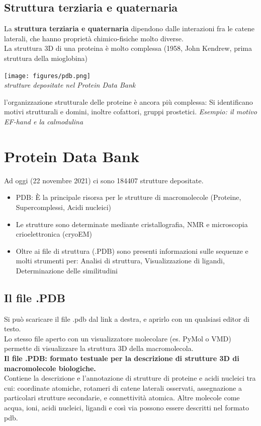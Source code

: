\documentclass{article}
\begin{document}
\subsection{Struttura terziaria e quaternaria}
La \textbf{struttura terziaria e quaternaria} dipendono dalle
interazioni fra le catene laterali, che hanno proprietà
chimico-fisiche molto diverse.\\
La struttura 3D di una proteina è molto complessa (1958,
John Kendrew, prima struttura della mioglobina)
\begin{center}
    \texttt{[image: figures/pdb.png]}\\
    \textit{strutture depositate nel Protein Data Bank}
\end{center}
l'organizzazione strutturale delle proteine è ancora più complessa:
Si identificano motivi strutturali e domini, inoltre cofattori, gruppi
prostetici. \textit{Esempio: il motivo EF-hand e la calmodulina}
\section{Protein Data Bank}
Ad oggi (22 novembre 2021) ci sono 184407 strutture depositate.
\begin{itemize}
    \item PDB: È la principale risorsa per le strutture di
    macromolecole (Proteine, Supercomplessi, Acidi nucleici)
    \item Le strutture sono determinate mediante cristallografia,
    NMR e microscopia crioelettronica (cryoEM)
    \item Oltre ai file di struttura (.PDB) sono presenti informazioni
    sulle sequenze e molti strumenti per:
        \subitem Analisi di struttura, Visualizzazione di ligandi,
        Determinazione delle similitudini
\end{itemize}
\subsection{Il file .PDB}
Si può scaricare il file .pdb dal link a destra, e aprirlo con un qualsiasi editor di testo.\\
Lo stesso file aperto con un visualizzatore molecolare (es. PyMol o VMD) permette di visualizzare la struttura 3D della macromolecola.\\
\textbf{Il file .PDB: formato testuale per la descrizione
di strutture 3D di macromolecole biologiche.}\\
Contiene la descrizione e l'annotazione di strutture di proteine e
acidi nucleici tra cui: coordinate atomiche, rotameri di catene
laterali osservati, assegnazione a particolari strutture secondarie, e
connettività atomica. Altre molecole come acqua, ioni, acidi
nucleici, ligandi e così via possono essere descritti nel formato pdb.
\end{document}
